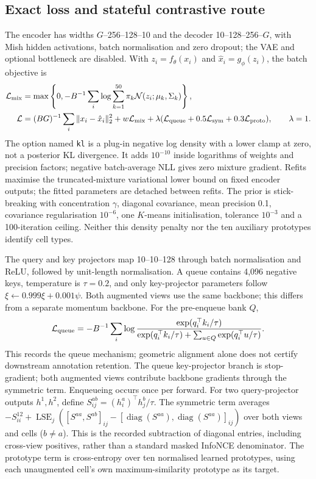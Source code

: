 \documentclass[11pt]{article}
\begin{document}
\subsection{Exact loss and stateful contrastive route}
The encoder has widths $G$--256--128--10 and the decoder
10--128--256--$G$, with Mish hidden activations, batch normalisation
and zero dropout; the VAE and optional bottleneck are disabled.
With $z_i=f_\theta(x_i)$ and $\hat x_i=g_\phi(z_i)$, the batch objective is
\begin{align}
 \mathcal L_{\rm mix}&=\max\left\{0,-B^{-1}\sum_i
  \log\sum_{k=1}^{50}\pi_k\mathcal N(z_i;\mu_k,\Sigma_k)\right\},\\
 \mathcal L&=(BG)^{-1}\sum_i\|x_i-\hat x_i\|_2^2+w\mathcal L_{\rm mix}
   +\lambda(\mathcal L_{\rm queue}+0.5\mathcal L_{\rm sym}
   +0.3\mathcal L_{\rm proto}),\qquad\lambda=1.
 \label{eq:contrastive-objective}
\end{align}
The option named \texttt{kl} is a plug-in negative log density with a
lower clamp at zero, not a posterior KL divergence. It adds $10^{-10}$
inside logarithms of weights and precision factors; negative batch-average
NLL gives zero mixture gradient. Refits maximise the truncated-mixture
variational lower bound on fixed encoder outputs\cite{blei2006variational};
the fitted parameters are detached between refits. The prior is
stick-breaking with concentration $\gamma$, diagonal covariance,
mean precision 0.1, covariance regularisation $10^{-6}$, one $K$-means
initialisation, tolerance $10^{-3}$ and a 100-iteration ceiling.
Neither this density penalty nor the ten auxiliary prototypes identify
cell types\cite{xie2016deep,miller2014inconsistency}.

The query and key projectors map 10--10--128 through batch normalisation
and ReLU, followed by unit-length normalisation. A queue contains 4,096
negative keys, temperature is $\tau=0.2$, and only key-projector
parameters follow $\xi\leftarrow0.999\xi+0.001\psi$.
Both augmented views use the same backbone; this differs from a separate
momentum backbone. For the pre-enqueue bank $Q$,
\begin{equation}
 \mathcal L_{\rm queue}=-B^{-1}\sum_i\log
 \frac{\exp(q_i^\top k_i/\tau)}
 {\exp(q_i^\top k_i/\tau)+\sum_{u\in Q}\exp(q_i^\top u/\tau)}.
\end{equation}
This records the queue mechanism\cite{he2020momentum}; geometric
alignment alone does not certify downstream annotation retention\cite{wang2020alignment}.
The queue key-projector branch is stop-gradient; both augmented views
contribute backbone gradients through the symmetric term.
Enqueueing occurs once per forward.
For two query-projector outputs $h^1,h^2$, define
$S^{ab}_{ij}=(h_i^a)^\top h_j^b/\tau$. The symmetric term averages
$-S^{12}_{ii}+\operatorname{LSE}_j([S^{aa},S^{ab}]_{ij}
-[\operatorname{diag}(S^{aa}),\operatorname{diag}(S^{aa})]_{ij})$
over both views and cells ($b\ne a$). This is the recorded subtraction
of diagonal entries, including cross-view positives, rather than a
standard masked InfoNCE denominator. The prototype term is cross-entropy
over ten normalised learned prototypes, using each unaugmented cell's
own maximum-similarity prototype as its target.
\end{document}
